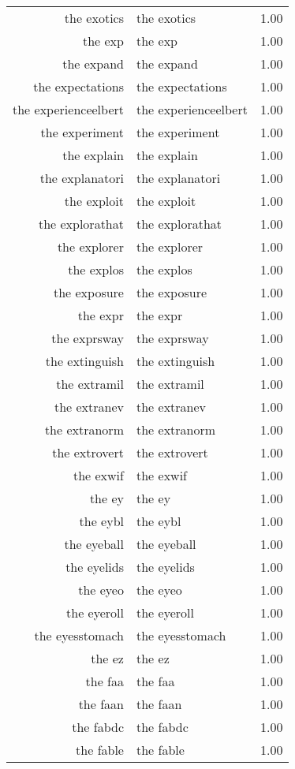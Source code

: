 \begin{table}[ht]
\begin{tabular}{rlr}
  the exotics & the exotics & 1.00 \\ 
  the exp & the exp & 1.00 \\ 
  the expand & the expand & 1.00 \\ 
  the expectations & the expectations & 1.00 \\ 
  the experienceelbert & the experienceelbert & 1.00 \\ 
  the experiment & the experiment & 1.00 \\ 
  the explain & the explain & 1.00 \\ 
  the explanatori & the explanatori & 1.00 \\ 
  the exploit & the exploit & 1.00 \\ 
  the explorathat & the explorathat & 1.00 \\ 
  the explorer & the explorer & 1.00 \\ 
  the explos & the explos & 1.00 \\ 
  the exposure & the exposure & 1.00 \\ 
  the expr & the expr & 1.00 \\ 
  the exprsway & the exprsway & 1.00 \\ 
  the extinguish & the extinguish & 1.00 \\ 
  the extramil & the extramil & 1.00 \\ 
  the extranev & the extranev & 1.00 \\ 
  the extranorm & the extranorm & 1.00 \\ 
  the extrovert & the extrovert & 1.00 \\ 
  the exwif & the exwif & 1.00 \\ 
  the ey & the ey & 1.00 \\ 
  the eybl & the eybl & 1.00 \\ 
  the eyeball & the eyeball & 1.00 \\ 
  the eyelids & the eyelids & 1.00 \\ 
  the eyeo & the eyeo & 1.00 \\ 
  the eyeroll & the eyeroll & 1.00 \\ 
  the eyesstomach & the eyesstomach & 1.00 \\ 
  the ez & the ez & 1.00 \\ 
  the faa & the faa & 1.00 \\ 
  the faan & the faan & 1.00 \\ 
  the fabdc & the fabdc & 1.00 \\ 
  the fable & the fable & 1.00 \\ 

\end{tabular}
\end{table}

